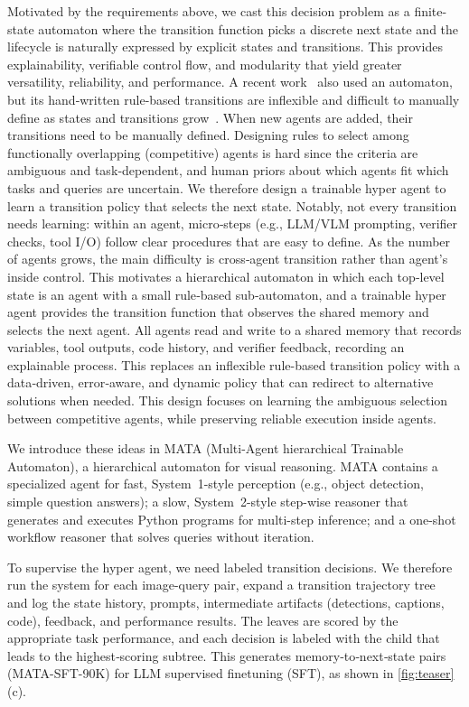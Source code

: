 \documentclass{article} %
\newcommand{\methodname}{MATA}
\newcommand{\methodfull}{Multi-Agent hierarchical Trainable Automaton}
\newcommand{\datasetname}{\methodname-SFT-90K}
\begin{document}
Motivated by the requirements above, we cast this decision problem as a finite-state automaton where the transition function picks a discrete next state and the lifecycle is naturally expressed by explicit states and transitions. This provides explainability, verifiable control flow, and modularity that yield greater versatility, reliability, and performance.  A recent work~\citep{cai_naver_2025} also used an automaton, but its hand‑written rule-based transitions are inflexible and difficult to manually define as states and transitions grow~\citep{wang_learning_2025, yue_synergistic_2025, dang_multi-agent_2025, wan_rema_2025}. When new agents are added, their transitions need to be manually defined. Designing rules to select among functionally overlapping (competitive) agents is hard since the criteria are ambiguous and task‑dependent, and human priors about which agents fit which tasks and queries are uncertain. We therefore design a trainable hyper agent to learn a transition policy that selects the next state. Notably, not every transition needs learning: within an agent, micro‑steps (e.g., LLM/VLM prompting, verifier checks, tool I/O) follow clear procedures that are easy to define. As the number of agents grows, the main difficulty is cross‑agent transition rather than agent's inside control. This motivates a hierarchical automaton in which each top‑level state is an agent with a small rule‑based sub‑automaton, and a trainable hyper agent provides the transition function that  observes the shared memory and selects the next agent. All agents read and write to a shared memory that records variables, tool outputs, code history, and verifier feedback, recording an explainable process. This replaces an inflexible rule-based transition policy with a data‑driven, error‑aware, and dynamic policy that can redirect to alternative solutions when needed. This design focuses on learning the ambiguous selection between competitive agents, while preserving reliable execution inside agents. 

We introduce these ideas in \methodname{} (\methodfull{}), a hierarchical automaton for visual reasoning. \methodname{} contains a specialized agent for fast, System~1-style perception (e.g., object detection, simple question answers); a slow, System~2-style step-wise reasoner that generates and executes Python programs for multi-step inference; and a one-shot workflow reasoner that solves queries without iteration.

To supervise the hyper agent, we need labeled transition decisions. We therefore run the system for each image-query pair, expand a transition trajectory tree~\citep{kearns_sparse_2002} and log the state history, prompts, intermediate artifacts (detections, captions, code), feedback, and performance results. The leaves are scored by the appropriate task performance, and each decision is labeled with the child that leads to the highest‑scoring subtree. This generates memory‑to‑next‑state pairs (\datasetname{}) for LLM supervised finetuning (SFT), as shown in \autoref{fig:teaser} (c).
\end{document}
